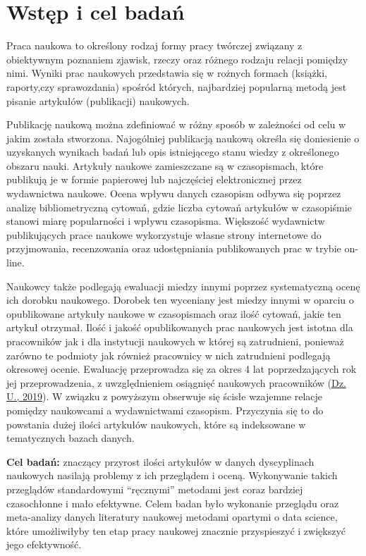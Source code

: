 \documentclass[
  12pt,
]{article}
\begin{document}
\newpage

\newpage
{}

\hypertarget{wstux119p-i-cel-badaux144}{%
\section{\texorpdfstring{Wstęp i cel
badań\label{label1}}{Wstęp i cel badań}}\label{wstux119p-i-cel-badaux144}}

Praca naukowa to określony rodzaj formy pracy twórczej związany z
obiektywnym poznaniem zjawisk, rzeczy oraz różnego rodzaju relacji
pomiędzy nimi. Wyniki prac naukowych przedstawia się w rożnych formach
(książki, raporty,czy sprawozdania) spośród których, najbardziej
popularną metodą jest pisanie artykułów (publikacji) naukowych.

Publikację naukową można zdefiniować w różny sposób w zależności od celu
w jakim została stworzona. Najogólniej publikacją naukową określa się
doniesienie o uzyskanych wynikach badań lub opis istniejącego stanu
wiedzy z określonego obszaru nauki. Artykuły naukowe zamieszczane są w
czasopismach, które publikują je w formie papierowej lub najczęściej
elektronicznej przez wydawnictwa naukowe. Ocena wpływu danych czasopism
odbywa się poprzez analizę bibliometryczną cytowań, gdzie liczba cytowań
artykułów w czasopiśmie stanowi miarę popularności i wpływu czasopisma.
Większość wydawnictw publikujących prace naukowe wykorzystuje własne
strony internetowe do przyjmowania, recenzowania oraz udostępniania
publikowanych prac w trybie on-line.

Naukowcy także podlegają ewaluacji miedzy innymi poprzez systematyczną
ocenę ich dorobku naukowego. Dorobek ten wyceniany jest miedzy innymi w
oparciu o opublikowane artykuły naukowe w czasopismach oraz ilość
cytowań, jakie ten artykuł otrzymał. Ilość i jakość opublikowanych prac
naukowych jest istotna dla pracowników jak i dla instytucji naukowych w
której są zatrudnieni, ponieważ zarówno te podmioty jak również
pracownicy w nich zatrudnieni podlegają okresowej ocenie. Ewaluację
przeprowadza się za okres 4 lat poprzedzających rok jej przeprowadzenia,
z uwzględnieniem osiągnięć naukowych pracowników
(\protect\hyperlink{ref-dz.u.2019}{Dz. U., 2019}). W związku z powyższym
obserwuje się ścisłe wzajemne relacje pomiędzy naukowcami a
wydawnictwami czasopism. Przyczynia się to do powstania dużej ilości
artykułów naukowych, które są indeksowane w tematycznych bazach danych.

\textbf{Cel badań:} znaczący przyrost ilości artykułów w danych
dyscyplinach naukowych nasilają problemy z ich przeglądem i oceną.
Wykonywanie takich przeglądów standardowymi ``ręcznymi'' metodami jest
coraz bardziej czasochłonne i mało efektywne. Celem badan było wykonanie
przeglądu oraz meta-analizy danych literatury naukowej metodami opartymi
o data science, które umożliwiłyby ten etap pracy naukowej znacznie
przyspieszyć i zwiększyć jego efektywność.
\end{document}
